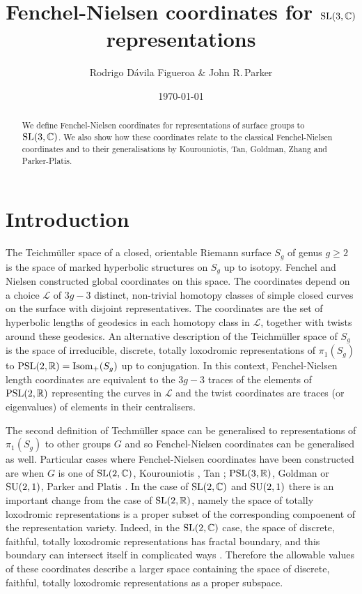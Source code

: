 \documentclass[11pt]{amsart}
\title{Fenchel-Nielsen coordinates for ${\rm SL}(3,{\mathbb C})$ representations}
\author{Rodrigo D\'avila Figueroa \& John R.\,Parker}
\date{\today}
\numberwithin{equation}{section}
\begin{document}
\maketitle

\begin{abstract}
We define Fenchel-Nielsen coordinates for representations of surface groups to ${\rm SL}(3,{\mathbb C})$. We also show how
these coordinates relate to the classical Fenchel-Nielsen coordinates and to their generalisations by Kourouniotis, Tan, Goldman,
Zhang and Parker-Platis. 
\end{abstract}

\section{Introduction} 

The Teichm\"uller space of a closed, orientable Riemann surface $S_g$ of genus $g\geq2$ is the space of marked 
hyperbolic structures on $S_g$ 
up to isotopy. Fenchel and Nielsen constructed global coordinates on this space. The coordinates depend on a choice 
${\mathcal L}$ of $3g-3$ distinct, non-trivial homotopy classes of simple closed curves on the surface with disjoint 
representatives.
The coordinates are the set 
of hyperbolic lengths of geodesics in each homotopy class in ${\mathcal L}$, together with twists around these geodesics. 
An alternative description of the Teichm\"uller space of $S_g$ is the space of irreducible, discrete, totally loxodromic 
representations of $\pi_1(S_g)$ to 
${\rm PSL}(2,{\mathbb R})={\rm Isom}_+(S_g)$ up to conjugation. In this context, Fenchel-Nielsen length coordinates are 
equivalent to 
the $3g-3$ traces of the elements of ${\rm PSL}(2,{\mathbb R})$ representing the curves in ${\mathcal L}$ and the twist
coordinates are traces (or eigenvalues) of elements in their centralisers. 

The second definition of Techm\"uller space can be generalised to representations of $\pi_1(S_g)$ to other groups $G$ and
so Fenchel-Nielsen coordinates can be generalised as well. Particular cases where Fenchel-Nielsen coordinates have been 
constructed are when $G$ is one of ${\rm SL}(2,{\mathbb C})$, Kourouniotis \cite{Kou}, Tan \cite{Tan}; 
${\rm PSL}(3,{\mathbb R})$, Goldman \cite{Gol} or ${\rm SU}(2,1)$, Parker and Platis \cite{PP}. In the case of 
${\rm SL}(2,{\mathbb C})$ and ${\rm SU}(2,1)$ there is an important change from the case of ${\rm SL}(2,{\mathbb R})$, namely
the space of totally loxodromic representations is a proper subset of the corresponding compoenent of the representation variety.
Indeed, in the ${\rm SL}(2,{\mathbb C})$ case, the space of discrete, faithful, totally loxodromic representations has 
fractal boundary, and this boundary can intersect itself in complicated ways \cite{AndCan}. 
Therefore the allowable values of these coordinates describe a larger space containing the space of discrete, faithful,
totally loxodromic representations as a proper subspace. 
\end{document}
